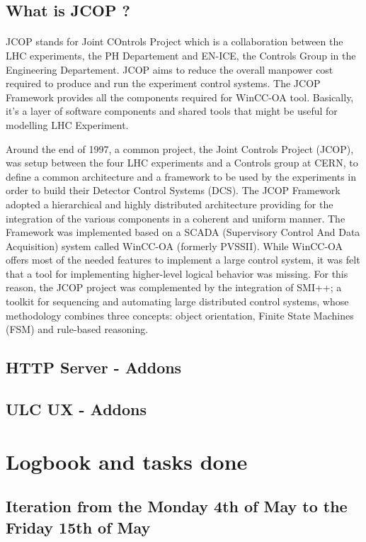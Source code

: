 \documentclass[a4paper, 10pt]{article}
\begin{document}
\subsection{What is JCOP ?}
\paragraph{}
JCOP stands for Joint COntrols Project which is a collaboration between the LHC experiments, the PH Departement and EN-ICE, the Controls Group in the Engineering Departement. 
JCOP aims to reduce the overall manpower cost required to produce and run the experiment control systems.
The JCOP Framework provides all the components required for WinCC-OA tool. 
Basically, it's a layer of software components and shared tools that might be useful for modelling LHC Experiment.

Around the end of 1997, a common project, the Joint Controls Project (JCOP), was setup between the four LHC experiments and a Controls group at CERN, to define a common architecture and a framework to be used by the experiments in order to build their Detector Control Systems (DCS).
The JCOP Framework adopted a hierarchical and highly distributed architecture providing for the integration of the various components in a coherent and uniform manner. 
The Framework was implemented based on a SCADA (Supervisory Control And Data Acquisition) system called WinCC-OA (formerly PVSSII). 
While WinCC-OA offers most of the needed features to implement a large control system, it was felt that a tool for implementing higher-level logical behavior was missing.
For this reason, the JCOP project was complemented by the integration of SMI++; a toolkit for sequencing and automating large distributed control systems, whose methodology combines three concepts: object orientation, Finite State Machines (FSM) and rule-based reasoning.

\subsection{HTTP Server - Addons}
\subsection{ULC UX - Addons}

\section{Logbook and tasks done}
\subsection{Iteration from the Monday 4th of May to the Friday 15th of May}
\end{document}
